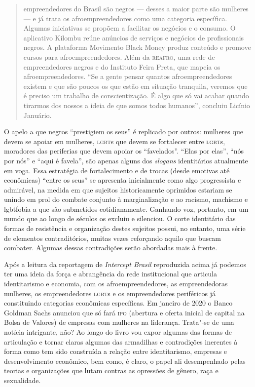 \begin{quote}
empreendedores do Brasil são negros --- desses a maior parte são mulheres
--- e já trata os afroempreendedores como uma categoria específica.
Algumas iniciativas se propõem a facilitar os negócios e o consumo. O
aplicativo Kilombu reúne anúncios de serviços e negócios de
profissionais negros. A plataforma Movimento Black Money produz conteúdo
e promove cursos para afroempreendedores. Além da \textsc{reafro}, uma rede de
empreendedores negros e do Instituto Feira Preta, que mapeia os
afroempreendedores. ``Se a gente pensar quantos afroempreendedores
existem e que são poucos os que estão em situação tranquila, veremos que
é preciso um trabalho de conscientização. É algo que só vai acabar
quando tirarmos dos nossos a ideia de que somos todos humanos'',
concluiu Licínio Januário.
\end{quote}

O apelo a que negros ``prestigiem os seus'' é replicado por outros:
mulheres que devem se apoiar em mulheres, \textsc{lgbt}s que devem se fortalecer
entre \textsc{lgbt}s, moradores das periferias que devem apoiar os ``favelados''.
``Elas por elas'', ``nós por nós'' e ``aqui é favela'', são apenas
alguns dos \emph{slogans} identitários atualmente em voga. Essa
estratégia de fortalecimento e de trocas (desde emotivas até econômicas)
``entre os seus'' se apresenta inicialmente como algo progressista e
admirável, na medida em que sujeitos historicamente oprimidos estariam
se unindo em prol do combate conjunto à marginalização e ao racismo,
machismo e lgbtfobia a que são submetidos cotidianamente. Ganhando voz,
portanto, em um mundo que ao longo de séculos os excluiu e silenciou. O
corte identitário das formas de resistência e organização destes
sujeitos possui, no entanto, uma série de elementos contraditórios,
muitas vezes reforçando aquilo que buscam combater. Algumas dessas
contradições serão abordadas mais à frente.

Após a leitura da reportagem de \emph{Intercept Brasil} reproduzida
acima já podemos ter uma ideia da força e abrangência da rede
institucional que articula identitarismo e economia, com os
afroempreendedores, as empreendedoras mulheres, os empreendedores \textsc{lgbt}s
e os empreendedores periféricos já constituindo categorias econômicas
específicas. Em janeiro de 2020 o Banco Goldman Sachs anunciou que só
fará \textsc{ipo} (abertura e oferta inicial de capital na Bolsa de Valores) de
empresas com mulheres na liderança. Trata"-se de uma notícia intrigante,
não? Ao longo do livro vou expor algumas das formas de articulação e
tornar claras algumas das armadilhas e contradições inerentes à forma
como tem sido construída a relação entre identitarismo, empresas e
desenvolvimento econômico, bem como, é claro, o papel ali desempenhado
pelas teorias e organizações que lutam contras as opressões de gênero,
raça e sexualidade.

